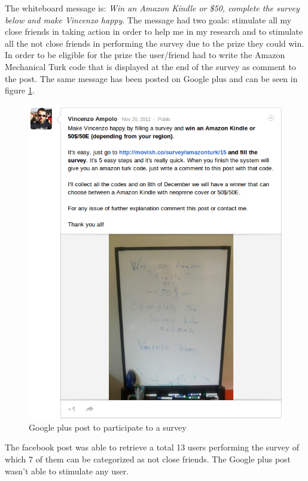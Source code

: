 The whiteboard message is: \textit{Win an Amazon Kindle or \$50, complete the survey below and make Vincenzo happy}. The message had two goals: stimulate all my close friends in taking action in order to help me in my research and to stimulate all the not close friends in performing the survey due to the prize they could win. In order to be eligible for the prize the user/friend had to write the Amazon Mechanical Turk code that is displayed at the end of the survey as comment to the post.  The same message has been posted on Google plus and can be seen in figure \ref{fig:google_plus_survey}.

\begin{figure}
  \centering
  \includegraphics[width=\textwidth]{figures/google_plus_survey.png}
  \caption{Google plus post to participate to a survey}
  \label{fig:google_plus_survey}
\end{figure}

The facebook post was able to retrieve a total 13 users performing the survey of which 7 of them can be categorized as not close friends. The Google plus post wasn't able to stimulate any user.

